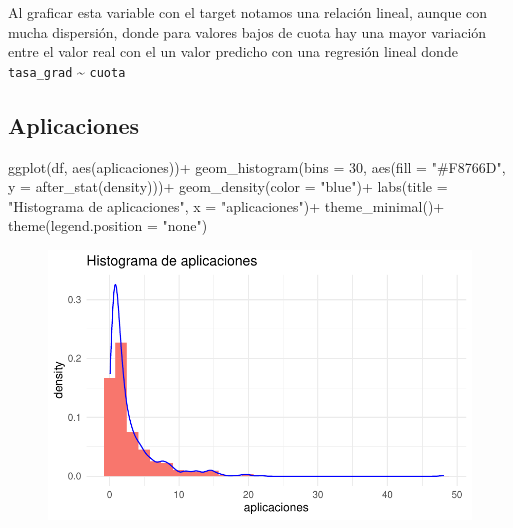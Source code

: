 \documentclass[
  letterpaper,
  DIV=11,
  numbers=noendperiod]{scrartcl}
\newenvironment{Shaded}{\begin{snugshade}}{\end{snugshade}}
\newcommand{\AttributeTok}[1]{\textcolor[rgb]{0.40,0.45,0.13}{#1}}
\newcommand{\DecValTok}[1]{\textcolor[rgb]{0.68,0.00,0.00}{#1}}
\newcommand{\FunctionTok}[1]{\textcolor[rgb]{0.28,0.35,0.67}{#1}}
\newcommand{\NormalTok}[1]{\textcolor[rgb]{0.00,0.23,0.31}{#1}}
\newcommand{\SpecialCharTok}[1]{\textcolor[rgb]{0.37,0.37,0.37}{#1}}
\newcommand{\StringTok}[1]{\textcolor[rgb]{0.13,0.47,0.30}{#1}}
\begin{document}
Al graficar esta variable con el target notamos una relación lineal,
aunque con mucha dispersión, donde para valores bajos de cuota hay una
mayor variación entre el valor real con el un valor predicho con una
regresión lineal donde \texttt{tasa\_grad} \textasciitilde{}
\texttt{cuota}

\hypertarget{aplicaciones}{%
\subsection{Aplicaciones}\label{aplicaciones}}

\begin{Shaded}
\begin{Highlighting}[]
\FunctionTok{ggplot}\NormalTok{(df, }\FunctionTok{aes}\NormalTok{(aplicaciones))}\SpecialCharTok{+}
  \FunctionTok{geom\_histogram}\NormalTok{(}\AttributeTok{bins =} \DecValTok{30}\NormalTok{, }\FunctionTok{aes}\NormalTok{(}\AttributeTok{fill =} \StringTok{"\#F8766D"}\NormalTok{, }\AttributeTok{y =} \FunctionTok{after\_stat}\NormalTok{(density)))}\SpecialCharTok{+}
  \FunctionTok{geom\_density}\NormalTok{(}\AttributeTok{color =} \StringTok{"blue"}\NormalTok{)}\SpecialCharTok{+}
  \FunctionTok{labs}\NormalTok{(}\AttributeTok{title =} \StringTok{"Histograma de aplicaciones"}\NormalTok{,}
       \AttributeTok{x =} \StringTok{"aplicaciones"}\NormalTok{)}\SpecialCharTok{+}
  \FunctionTok{theme\_minimal}\NormalTok{()}\SpecialCharTok{+}
  \FunctionTok{theme}\NormalTok{(}\AttributeTok{legend.position =} \StringTok{"none"}\NormalTok{)}
\end{Highlighting}
\end{Shaded}

\begin{figure}[H]

{\centering \includegraphics{TP_final_files/figure-pdf/unnamed-chunk-9-1.pdf}

}

\end{figure}
\end{document}
